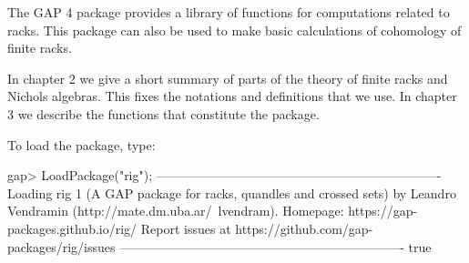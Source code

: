 

The GAP 4 package {\RiG} provides a library of functions for computations
related to racks. This package can also be used to make basic calculations 
of cohomology of finite racks.
 
In chapter 2 we give a short summary of parts of the theory of finite racks
and Nichols algebras. This fixes the notations and definitions that we use. 
In chapter 3 we describe the functions that constitute the package.

To load the package, type: 

\beginexample
gap> LoadPackage("rig");
-------------------------------------------------------------------
Loading  rig 1 (A GAP package for racks, quandles and crossed sets)
by Leandro Vendramin (http://mate.dm.uba.ar/~lvendram).
Homepage: https://gap-packages.github.io/rig/
Report issues at https://github.com/gap-packages/rig/issues
-------------------------------------------------------------------
true
\endexample


